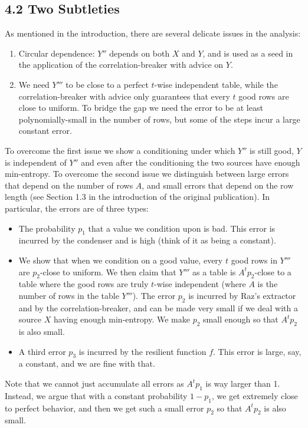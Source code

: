 \documentclass[10pt,a4paper]{article}
\begin{document}
\subsection*{4.2 Two Subtleties}
As mentioned in the introduction, there are several delicate issues in the analysis:
\begin{enumerate}
\item Circular dependence: $Y''$ depends on both $X$ and $Y$, and is used as a seed in the application of the correlation-breaker with advice on $Y$.
\item We need $Y'''$ to be close to a perfect $t$-wise independent table, while the correlation-breaker with advice only guarantees that every $t$ good rows are close to uniform. To bridge the gap we need the error to be at least polynomially-small in the number of rows, but some of the steps incur a large constant error.
\end{enumerate}
To overcome the first issue we show a conditioning under which $Y''$ is still good, $Y$ is independent of $Y''$ and even after the conditioning the two sources have enough min-entropy.
To overcome the second issue we distinguish between large errors that depend on the number of rows $A$, and small errors that depend on the row length (see Section 1.3 in the introduction of the original publication). In particular, the errors are of three types:
\begin{itemize}
\item The probability $p_1$ that a value we condition upon is bad. This error is incurred by the condenser and is high (think of it as being a constant).
\item We show that when we condition on a good value, every $t$ good rows in $Y'''$ are $p_2$-close to uniform. We then claim that $Y'''$ as a table is $A^tp_2$-close to a table where the good rows are truly $t$-wise independent (where $A$ is the number of rows in the table $Y'''$). The error $p_2$ is incurred by Raz's extractor and by the correlation-breaker, and can be made very small if we deal with a source $X$ having enough min-entropy. We make $p_2$ small enough so that $A^tp_2$ is also small.
\item A third error $p_3$ is incurred by the resilient function $f$. This error is large, say, a constant, and we are fine with that.
\end{itemize}
Note that we cannot just accumulate all errors as $A^tp_1$ is way larger than 1. Instead, we argue that with a constant probability $1-p_1$, we get extremely close to perfect behavior, and then we get such a small error $p_2$ so that $A^tp_2$ is also small.
\end{document}
